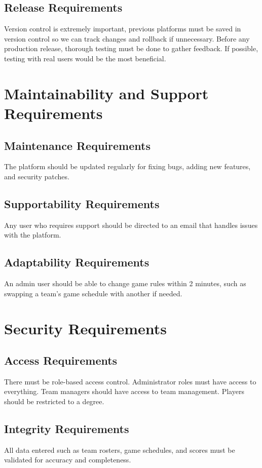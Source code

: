 \documentclass[12pt]{article}
\begin{document}
\subsection{Release Requirements}
Version control is extremely important, previous platforms must be saved in version control so we can track changes and rollback if unnecessary.
Before any production release, thorough testing must be done to gather feedback. If possible, testing with real users would be the most beneficial.

\section{Maintainability and Support Requirements}
\subsection{Maintenance Requirements}
The platform should be updated regularly for fixing bugs, adding new features, and security patches.

\subsection{Supportability Requirements}
Any user who requires support should be directed to an email that handles issues with the platform.

\subsection{Adaptability Requirements}
An admin user should be able to change game rules within 2 minutes, such as swapping a team’s game schedule with another if needed.

\section{Security Requirements}
\subsection{Access Requirements}
There must be role-based access control. Administrator roles must have access to everything. Team managers should have access to team management. Players should be restricted to a degree.

\subsection{Integrity Requirements}
All data entered such as team rosters, game schedules, and scores must be validated for accuracy and completeness.
\end{document}
